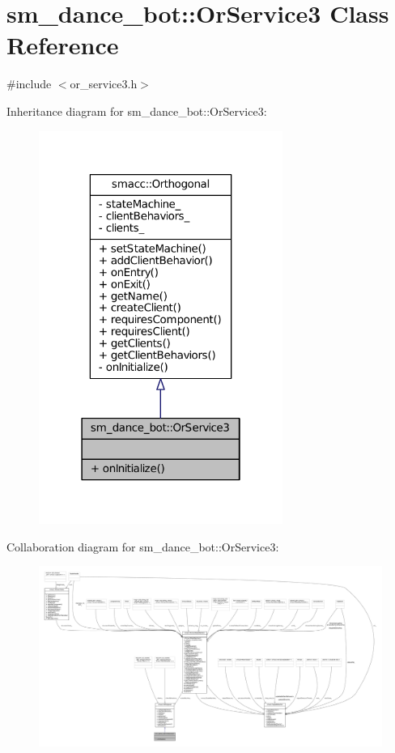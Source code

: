\hypertarget{classsm__dance__bot_1_1OrService3}{}\section{sm\+\_\+dance\+\_\+bot\+:\+:Or\+Service3 Class Reference}
\label{classsm__dance__bot_1_1OrService3}


{\ttfamily \#include $<$or\+\_\+service3.\+h$>$}



Inheritance diagram for sm\+\_\+dance\+\_\+bot\+:\+:Or\+Service3\+:
\nopagebreak
\begin{figure}[H]
\begin{center}
\leavevmode
\includegraphics[width=226pt]{classsm__dance__bot_1_1OrService3__inherit__graph}
\end{center}
\end{figure}


Collaboration diagram for sm\+\_\+dance\+\_\+bot\+:\+:Or\+Service3\+:
\nopagebreak
\begin{figure}[H]
\begin{center}
\leavevmode
\includegraphics[width=350pt]{classsm__dance__bot_1_1OrService3__coll__graph}
\end{center}
\end{figure}
